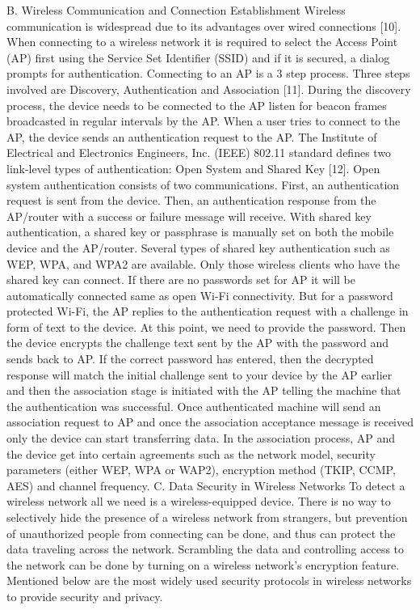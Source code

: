 B. Wireless Communication and Connection Establishment
Wireless communication is widespread due to its advantages over wired connections [10]. When connecting to a wireless network it is required to select the Access Point (AP) first using the Service Set Identifier (SSID) and if it is secured, a dialog prompts for authentication. Connecting to an AP is a 3 step process. Three steps involved are Discovery, Authentication and Association [11]. 
During the discovery process, the device needs to be connected to the AP listen for beacon frames broadcasted in regular intervals by the AP. When a user tries to connect to the AP, the device sends an authentication request to the AP. 
The Institute of Electrical and Electronics Engineers, Inc. (IEEE) 802.11 standard defines two link-level types of authentication: Open System and Shared Key [12]. Open system authentication consists of two communications. First, an authentication request is sent from the device. Then, an authentication response from the AP/router with a success or failure message will receive. With shared key authentication, a shared key or passphrase is manually set on both the mobile device and the AP/router. Several types of shared key authentication such as WEP, WPA, and WPA2 are available. Only those wireless clients who have the shared key can connect. If there are no passwords set for AP it will be automatically connected same as open Wi-Fi connectivity. But for a password protected Wi-Fi, the AP replies to the authentication request with a challenge in form of text to the device. At this point, we need to provide the password. Then the device encrypts the challenge text sent by the AP with the password and sends back to AP. If the correct password has entered, then the decrypted response will match the initial challenge sent to your device by the AP earlier and then the association stage is initiated with the AP telling the machine that the authentication was successful.
Once authenticated machine will send an association request to AP and once the association acceptance message is received only the device can start transferring data. In the association process, AP and the device get into certain agreements such as the network model, security parameters (either WEP, WPA or WAP2), encryption method (TKIP, CCMP, AES) and channel frequency.
C. Data Security in Wireless Networks
To detect a wireless network all we need is a wireless-equipped device. There is no way to selectively hide the presence of a wireless network from strangers, but prevention of unauthorized people from connecting can be done, and thus can protect the data traveling across the network. Scrambling the data and controlling access to the network can be done by turning on a wireless network's encryption feature. Mentioned below are the most widely used security protocols in wireless networks to provide security and privacy.
